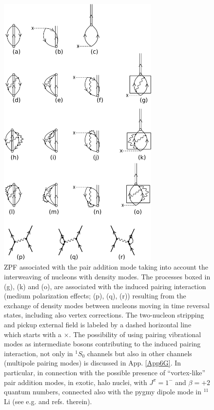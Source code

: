 \begin{figure}[h!]
\centerline {
\includegraphics*[width=8cm]{introduccion/figs/figintroA3}
}
\caption[ZPF associated with the pair addition mode taking into account the interweaving of nucleons with density modes.]{ ZPF associated with the pair addition mode taking into account the interweaving of nucleons with density modes. The processes boxed in (g), (k) and (o), are associated with the induced pairing interaction (medium polarization effects; (p), (q), (r)) resulting from the exchange of density modes between nucleons moving in time reversal states, including also vertex corrections. The two-nucleon stripping and pickup external field is labeled by a dashed horizontal line which starts with a $\times$. The possibility of using pairing vibrational modes as intermediate bosons contributing to the induced pairing interaction, not only in $^1S_0$ channels but also in other channels (multipole pairing modes) is discussed in App. \ref{App6G}. In particular, in connection with the possible presence of ``vortex-like'' pair addition modes, in exotic, halo nuclei, with $J^\pi=1^-$ and $\beta=+2$ quantum numbers, connected also with the pygmy dipole mode in $^{11}$Li (see e.g. \cite{Broglia:19} and refs. therein).}
\label{figintroA3}
\end{figure}


